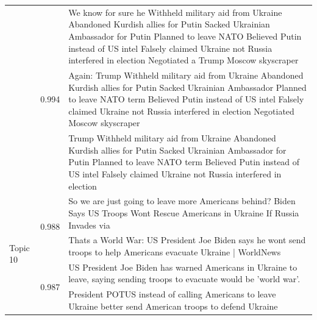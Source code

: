 \begin{table}[htbp]
{\begin{tabular}{llp{18cm}}
                                      & \multirow{3}{*}{0.994} & We know for sure he Withheld military aid from Ukraine Abandoned Kurdish allies for Putin Sacked Ukrainian Ambassador for Putin Planned to leave NATO Believed Putin instead of US intel Falsely claimed Ukraine not Russia interfered in election Negotiated a Trump Moscow skyscraper \\
                                      & \multirow{3}{*}{0.994} & Again: Trump Withheld military aid from Ukraine Abandoned Kurdish allies for Putin Sacked Ukrainian Ambassador Planned to leave NATO term Believed Putin instead of US intel Falsely claimed Ukraine not Russia interfered in election Negotiated Moscow skyscraper                     \\
                                      & \multirow{3}{*}{0.993} & Trump Withheld military aid from Ukraine Abandoned Kurdish allies for Putin Sacked Ukrainian Ambassador for Putin Planned to leave NATO term Believed Putin instead of US intel Falsely claimed Ukraine not Russia interfered in election                                               \\
            \midrule
            \multirow{8}{*}{Topic 10} & \multirow{2}{*}{0.988} & So we are just going to leave more Americans behind? Biden Says US Troops Wont Rescue Americans in Ukraine If Russia Invades via                                                                                                                                                        \\
                                      & 0.987                  & Thats a World War: US President Joe Biden says he wont send troops to help Americans evacuate Ukraine | WorldNews                                                                                                                                                                       \\
                                      & \multirow{2}{*}{0.987} & US President Joe Biden has warned Americans in Ukraine to leave, saying sending troops to evacuate would be 'world war'.                                                                                                                                                                \\
                                      & 0.987                  & President POTUS instead of calling Americans to leave Ukraine better send American troops to defend Ukraine                                                                                                                                                                             \\

\end{tabular}}
\end{table}
